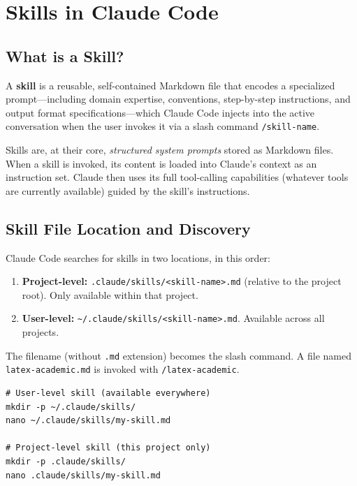 \documentclass[11pt,letterpaper]{article}
\begin{document}
\section{Skills in Claude Code}

\subsection{What is a Skill?}

\begin{definitionbox}[title=Skill (Claude Code)]
A \textbf{skill} is a reusable, self-contained Markdown file that encodes a specialized prompt---including domain expertise, conventions, step-by-step instructions, and output format specifications---which Claude Code injects into the active conversation when the user invokes it via a slash command \texttt{/skill-name}.
\end{definitionbox}

Skills are, at their core, \emph{structured system prompts} stored as Markdown files. When a skill is invoked, its content is loaded into Claude's context as an instruction set. Claude then uses its full tool-calling capabilities (whatever tools are currently available) guided by the skill's instructions.

\subsection{Skill File Location and Discovery}

Claude Code searches for skills in two locations, in this order:

\begin{enumerate}[leftmargin=*]
    \item \textbf{Project-level:} \texttt{.claude/skills/<skill-name>.md} (relative to the project root). Only available within that project.
    \item \textbf{User-level:} \texttt{\textasciitilde/.claude/skills/<skill-name>.md}. Available across all projects.
\end{enumerate}

The filename (without \texttt{.md} extension) becomes the slash command. A file named \texttt{latex-academic.md} is invoked with \texttt{/latex-academic}.

\begin{lstlisting}[style=BashStyle, caption={Creating a skill file}]
# User-level skill (available everywhere)
mkdir -p ~/.claude/skills/
nano ~/.claude/skills/my-skill.md

# Project-level skill (this project only)
mkdir -p .claude/skills/
nano .claude/skills/my-skill.md
\end{lstlisting}
\end{document}
